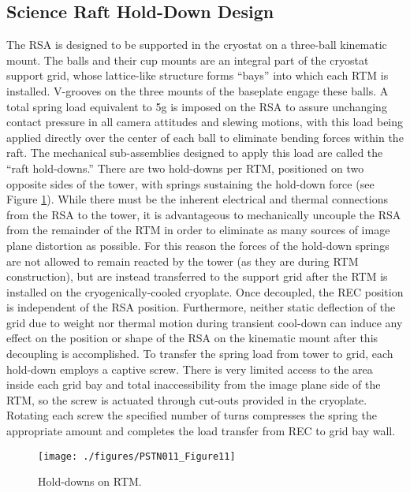 \subsection{Science Raft Hold-Down Design}
The RSA is designed to be supported in the cryostat on a three-ball kinematic mount. The balls and their cup mounts are an integral part of the cryostat support grid, whose lattice-like structure forms “bays” into which each RTM is installed. V-grooves on the three mounts of the baseplate engage these balls. A total spring load equivalent to 5g is imposed on the RSA to assure unchanging contact pressure in all camera attitudes and slewing motions, with this load being applied directly over the center of each ball to eliminate bending forces within the raft. The mechanical sub-assemblies designed to apply this load are called the “raft hold-downs.” There are two hold-downs per RTM, positioned on two opposite sides of the tower, with springs sustaining the hold-down force (see Figure \ref{fig:Fig11}).
While there must be the inherent electrical and thermal connections from the RSA to the tower, it is advantageous to mechanically uncouple the RSA from the remainder of the RTM in order to eliminate as many sources of image plane distortion as possible. For this reason the forces of the hold-down springs are not allowed to remain reacted by the tower (as they are during RTM construction), but are instead transferred to the support grid after the RTM is installed on the cryogenically-cooled cryoplate. Once decoupled, the REC position is independent of the RSA position. Furthermore, neither static deflection of the grid due to weight nor thermal motion during transient cool-down can induce any effect on the position or shape of the RSA on the kinematic mount after this decoupling is accomplished.
To transfer the spring load from tower to grid, each hold-down employs a captive screw. There is very limited access to the area inside each grid bay and total inaccessibility from the image plane side of the RTM, so the screw is actuated through cut-outs provided in the cryoplate. Rotating each screw the specified number of turns compresses the spring the appropriate amount and completes the load transfer from REC to grid bay wall. 

\begin{figure}[htbp]
\begin{center}
\texttt{[image: ./figures/PSTN011\_Figure11]}
\caption{Hold-downs on RTM.}
\label{fig:Fig11}
\end{center}
\end{figure}

